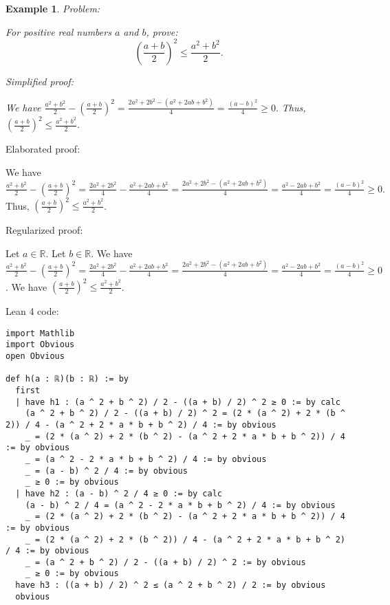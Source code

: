 \documentclass{article}
\newtheorem{example}{Example}
\begin{document}
\begin{example}
Problem:
\begin{tcolorbox}[colback=yellow!10, width=\linewidth]
For positive real numbers $a$ and $b$, prove:
    $$\left(\frac{a+b}{2}\right)^2 \leq \frac{a^2+b^2}{2}.$$
\end{tcolorbox}

Simplified proof:
\begin{tcolorbox}[colback=blue!10, width=\linewidth]
We have
$ \frac{a^2+b^2}{2} - \left(\frac{a+b}{2}\right)^2 = \frac{2a^2+2b^2-(a^2+2ab+b^2)}{4} = \frac{(a-b)^2}{4} \ge 0. $
Thus, $\left(\frac{a+b}{2}\right)^2 \leq \frac{a^2+b^2}{2}$.
\end{tcolorbox}
\end{example}

Elaborated proof:
\begin{tcolorbox}[colback=green!10, width=\linewidth]
We have
$ \frac{a^2+b^2}{2} - \left(\frac{a+b}{2}\right)^2 = \frac{2a^2+2b^2}{4} - \frac{a^2+2ab+b^2}{4} = \frac{2a^2+2b^2-(a^2+2ab+b^2)}{4} = \frac{a^2-2ab+b^2}{4} = \frac{(a-b)^2}{4} \ge 0. $
Thus, $\left(\frac{a+b}{2}\right)^2 \leq \frac{a^2+b^2}{2}$.
\end{tcolorbox}

Regularized proof:
\begin{tcolorbox}[colback=red!10, width=\linewidth]
Let $a\in\mathbb{R}$.
Let $b\in\mathbb{R}$.
We have $\frac{a^2+b^2}{2} - {\left(\frac{a+b}{2}\right)}^2 = \frac{2a^2+2b^2}{4} - \frac{a^2+2ab+b^2}{4} = \frac{2a^2+2b^2-(a^2+2ab+b^2)}{4} = \frac{a^2-2ab+b^2}{4} = \frac{{(a-b)}^2}{4} \ge 0$.
We have ${\left(\frac{a+b}{2}\right)}^2 \leq \frac{a^2+b^2}{2}$.
\end{tcolorbox}

Lean 4 code:
\begin{tcolorbox}[colback=white!10, width=\linewidth]
\begin{lstlisting}[language=Lean4]
import Mathlib
import Obvious
open Obvious

def h(a : ℝ)(b : ℝ) := by
  first
  | have h1 : (a ^ 2 + b ^ 2) / 2 - ((a + b) / 2) ^ 2 ≥ 0 := by calc
    (a ^ 2 + b ^ 2) / 2 - ((a + b) / 2) ^ 2 = (2 * (a ^ 2) + 2 * (b ^ 2)) / 4 - (a ^ 2 + 2 * a * b + b ^ 2) / 4 := by obvious
    _ = (2 * (a ^ 2) + 2 * (b ^ 2) - (a ^ 2 + 2 * a * b + b ^ 2)) / 4 := by obvious
    _ = (a ^ 2 - 2 * a * b + b ^ 2) / 4 := by obvious
    _ = (a - b) ^ 2 / 4 := by obvious
    _ ≥ 0 := by obvious
  | have h2 : (a - b) ^ 2 / 4 ≥ 0 := by calc
    (a - b) ^ 2 / 4 = (a ^ 2 - 2 * a * b + b ^ 2) / 4 := by obvious
    _ = (2 * (a ^ 2) + 2 * (b ^ 2) - (a ^ 2 + 2 * a * b + b ^ 2)) / 4 := by obvious
    _ = (2 * (a ^ 2) + 2 * (b ^ 2)) / 4 - (a ^ 2 + 2 * a * b + b ^ 2) / 4 := by obvious
    _ = (a ^ 2 + b ^ 2) / 2 - ((a + b) / 2) ^ 2 := by obvious
    _ ≥ 0 := by obvious
  have h3 : ((a + b) / 2) ^ 2 ≤ (a ^ 2 + b ^ 2) / 2 := by obvious
  obvious

\end{lstlisting}
\end{tcolorbox}
\end{document}
